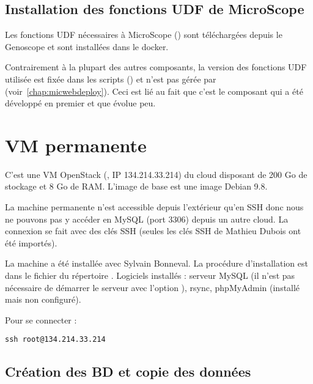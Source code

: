 \subsection{Installation des fonctions UDF de MicroScope}

Les fonctions UDF nécessaires à MicroScope ()
sont téléchargées depuis le Genoscope et
sont installées dans le docker.

\begin{warningbox}
    Contrairement à la plupart des autres composants, la version des fonctions UDF utilisée
    est fixée dans les scripts (\micUDFVersion) et n'est pas gérée par \micWEBdeployVer{} (voir~\autoref{chap:micwebdeploy}).
    Ceci est lié au fait que c'est le composant qui a été développé en premier
    et que  évolue peu.
\end{warningbox}

\section{VM permanente}\label{VMpermanente}

C'est une VM OpenStack (, IP 134.214.33.214) du cloud  disposant de 200 Go de stockage et 8 Go de RAM.
L'image de base est une image Debian 9.8.

La machine permanente n'est accessible depuis l'extérieur qu'en SSH donc nous ne pouvons pas y accéder en MySQL (port 3306) depuis un autre cloud.
La connexion se fait avec des clés SSH (seules les clés SSH de Mathieu Dubois ont été importés).

La machine a été installée avec Sylvain Bonneval.
La procédure d'installation est dans le fichier  du répertoire .
Logiciels installés : serveur MySQL (il n'est pas nécessaire de démarrer le serveur avec l'option ), rsync, phpMyAdmin (installé mais non configuré).

Pour se connecter :
\begin{lstlisting}[style=bash]
ssh root@134.214.33.214
\end{lstlisting}

\subsection{Création des BD et copie des données}

